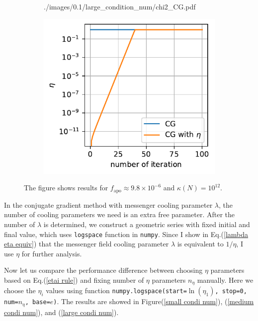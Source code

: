 \documentclass[11pt, letterpaper]{article}
\begin{document}
\begin{figure}[htb]
\begin{subfigure}{0.33\textwidth}
        {./images/0.1/large_condition_num/chi2_CG.pdf}
    \caption{}
    \label{large condi num chi2 CG}
\end{subfigure}%
\begin{subfigure}{0.33\textwidth}
    \centering
    \includegraphics[width=\linewidth]
        {./images/0.1/large_condition_num/eta_CG.pdf}
    \caption{}
    \label{large condi num eta CG}
\end{subfigure}
\caption{The figure shows results for $f_{\text{apo}}\approx 9.8\times10^{-6}$ 
    and $\kappa(N) = 10^{12}$.
}
\label{large condi num CG}
\end{figure}

In the conjugate gradient method with messenger cooling parameter $\lambda$, 
the number of cooling parameters we need is an extra free parameter.
After the number of $\lambda$ is determined, we construct a geometric series
with fixed initial and final value, which uses \texttt{logspace}
function in \texttt{numpy}.
Since I  show in Eq.(\ref{lambda eta equiv}) that the messenger field
cooling parameter $\lambda$ is equivalent to $1/\eta$, I use $\eta$ for further analysis.

Now let us compare the performance difference between choosing $\eta$
parameters based on Eq.(\ref{etai rule})
and fixing number of $\eta$ parameters $n_{\eta}$ manually.
Here we choose the $\eta_i$ values using function
\texttt{numpy.logspace(start=$\ln(\eta_1)$, stop=0, num=$n_{\eta}$, base=$e$)}.
The results are showed in Figure(\ref{small condi num}),
(\ref{medium condi num}), and (\ref{large condi num}).
\end{document}
